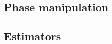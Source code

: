 \subsection{Phase manipulation}
\label{sec:phasectl}
%
%
%
%
%



\subsection{Estimators}
\label{sec:estimator}

